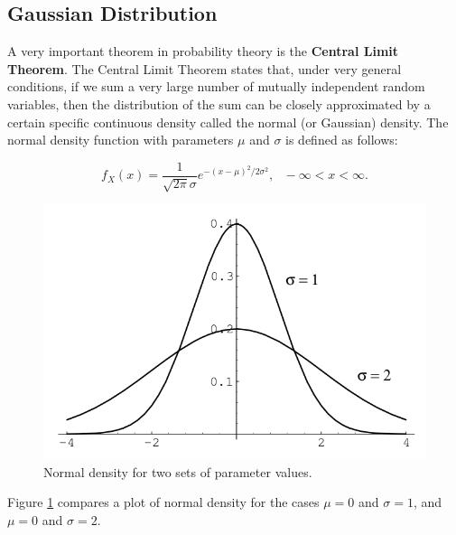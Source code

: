 
\subsection{\label{gaussian} Gaussian Distribution}
A very important theorem in probability theory is the {\bf Central Limit Theorem}. The Central Limit Theorem states that, under very general conditions, if we sum a very large number of mutually independent random variables, then the distribution of the sum can be closely approximated by a certain specific continuous density called the normal (or Gaussian) density. The normal density function with parameters $\mu$ and $\sigma$ is defined as follows:

\begin{equation*}
f_{X}(x)=\frac{1}{\sqrt{2\pi}\sigma}e^{-(x-\mu)^2/2\sigma^2}, \text{   }-\infty < x < \infty.
\end{equation*}


\begin{figure}[h]
\begin{center}
    \includegraphics[width=0.6\columnwidth]{figs/intro/normal.png}
  \caption{\label{fig:normaldist} Normal density for two sets of parameter values.}
\end{center}
\end{figure}

Figure \ref{fig:normaldist} compares a plot of normal density for the cases $\mu=0$ and $\sigma=1$, and 
$\mu=0$ and  $\sigma=2$.


